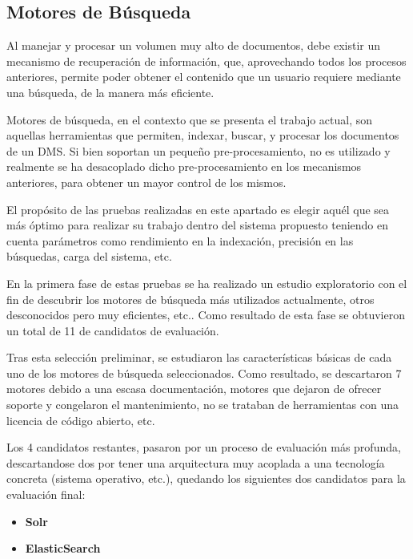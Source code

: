 \documentclass[runningheads,a4paper]{llncs}
\theoremstyle{break}
\begin{document}
\subsection{Motores de Búsqueda}
Al manejar y procesar un volumen muy alto de documentos, debe existir un mecanismo de recuperación de información, que, aprovechando todos los procesos anteriores, permite poder obtener el contenido que un usuario requiere mediante una búsqueda, de la manera más eficiente.

Motores de búsqueda, en el contexto que se presenta el trabajo actual, son aquellas herramientas que permiten, indexar, buscar, y procesar los documentos de un DMS. Si bien soportan un pequeño pre-procesamiento, no es utilizado y realmente se ha desacoplado dicho pre-procesamiento en los mecanismos anteriores, para obtener un mayor control de los mismos.

El propósito de las pruebas realizadas en este apartado es elegir aquél que sea más óptimo para realizar su trabajo dentro del sistema propuesto teniendo en cuenta parámetros como rendimiento en la  indexación, precisión en las búsquedas, carga del sistema, etc.

En la primera fase de estas pruebas se ha realizado un estudio exploratorio con el fin de  descubrir los motores de búsqueda más utilizados actualmente, otros desconocidos pero muy eficientes, etc..  Como resultado de esta fase se obtuvieron un total de 11 de candidatos de evaluación.

Tras esta selección preliminar, se estudiaron las características básicas de cada uno de los motores de búsqueda seleccionados. Como resultado, se descartaron 7 motores debido a una escasa documentación, motores que dejaron de ofrecer soporte y congelaron el mantenimiento, no se trataban de herramientas con una licencia de código abierto, etc.

Los 4 candidatos restantes, pasaron por un proceso de evaluación más profunda, descartandose dos por tener una arquitectura muy acoplada a una tecnología concreta (sistema operativo, etc.), quedando los siguientes dos candidatos para la evaluación final:
\textbf{}\\

\begin{itemize}
  \item \textbf{Solr}
  \item \textbf{ElasticSearch}
\end{itemize}

\pagebreak
\end{document}
